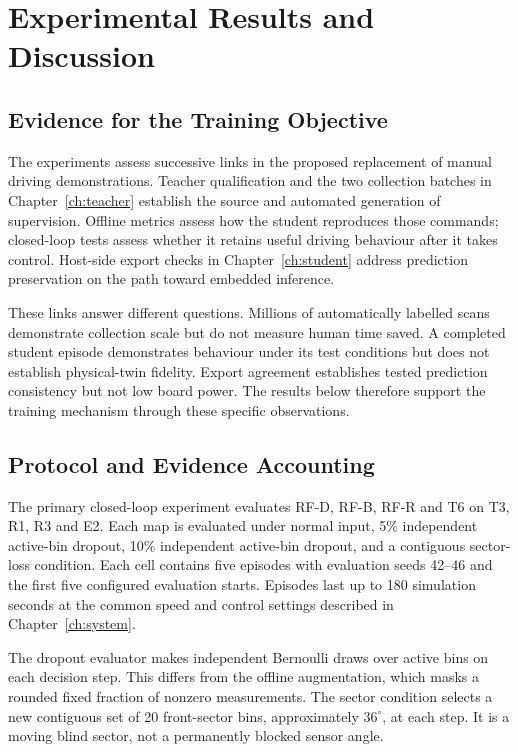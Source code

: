 \chapter{Experimental Results and Discussion}
\label{ch:results}
\section{Evidence for the Training Objective}
The experiments assess successive links in the proposed replacement of manual
driving demonstrations. Teacher qualification and the two collection batches
in Chapter~\ref{ch:teacher} establish the source and automated generation of
supervision. Offline metrics assess how the student reproduces those commands;
closed-loop tests assess whether it retains useful driving behaviour after it
takes control. Host-side export checks in Chapter~\ref{ch:student} address
prediction preservation on the path toward embedded inference.

These links answer different questions. Millions of automatically labelled
scans demonstrate collection scale but do not measure human time saved. A
completed student episode demonstrates behaviour under its test conditions but
does not establish physical-twin fidelity. Export agreement establishes tested
prediction consistency but not low board power. The results below therefore
support the training mechanism through these specific observations.

\section{Protocol and Evidence Accounting}
The primary closed-loop experiment evaluates RF-D, RF-B, RF-R and T6 on T3,
R1, R3 and E2. Each map is evaluated under normal input, 5\% independent
active-bin dropout, 10\% independent active-bin dropout, and a contiguous
sector-loss condition. Each cell contains five episodes with evaluation seeds
42--46 and the first five configured evaluation starts. Episodes last up to
180 simulation seconds at the common speed and control settings described
in Chapter~\ref{ch:system}.

The dropout evaluator makes independent Bernoulli draws over active bins on
each decision step. This differs from the offline augmentation, which masks
a rounded fixed fraction of nonzero measurements. The sector condition selects
a new contiguous set of 20 front-sector bins, approximately $36^\circ$, at
each step. It is a moving blind sector, not a permanently blocked sensor angle.

